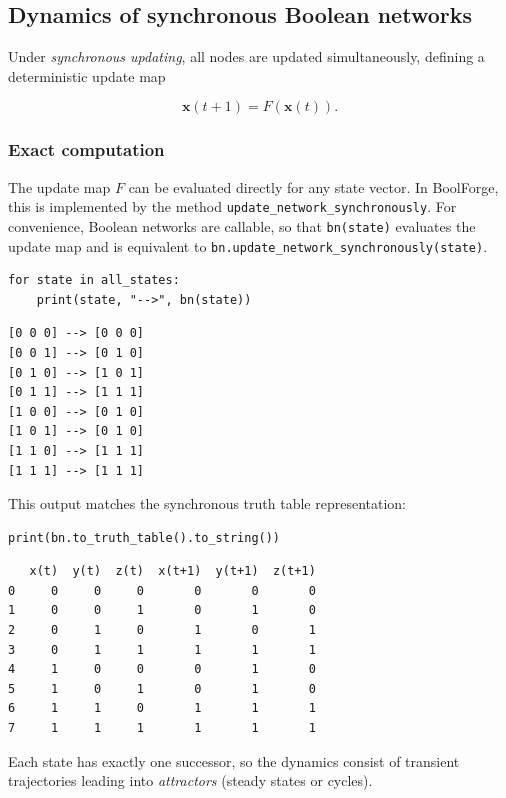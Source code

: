 \documentclass[
]{article}
\begin{document}
\subsection{Dynamics of synchronous Boolean
networks}\label{dynamics-of-synchronous-boolean-networks}

Under \emph{synchronous updating}, all nodes are updated simultaneously,
defining a deterministic update map

\[
\mathbf{x}(t+1) = F(\mathbf{x}(t)).
\]

\subsubsection{Exact computation}\label{exact-computation}

The update map \(F\) can be evaluated directly for any state vector. In
BoolForge, this is implemented by the method
\texttt{update\_network\_synchronously}. For convenience, Boolean
networks are callable, so that \texttt{bn(state)} evaluates the update
map and is equivalent to
\texttt{bn.update\_network\_synchronously(state)}.

\begin{lstlisting}
for state in all_states:
    print(state, "-->", bn(state))
\end{lstlisting}

\begin{lstlisting}
[0 0 0] --> [0 0 0]
[0 0 1] --> [0 1 0]
[0 1 0] --> [1 0 1]
[0 1 1] --> [1 1 1]
[1 0 0] --> [0 1 0]
[1 0 1] --> [0 1 0]
[1 1 0] --> [1 1 1]
[1 1 1] --> [1 1 1]
\end{lstlisting}

This output matches the synchronous truth table representation:

\begin{lstlisting}
print(bn.to_truth_table().to_string())
\end{lstlisting}

\begin{lstlisting}
   x(t)  y(t)  z(t)  x(t+1)  y(t+1)  z(t+1)
0     0     0     0       0       0       0
1     0     0     1       0       1       0
2     0     1     0       1       0       1
3     0     1     1       1       1       1
4     1     0     0       0       1       0
5     1     0     1       0       1       0
6     1     1     0       1       1       1
7     1     1     1       1       1       1
\end{lstlisting}

Each state has exactly one successor, so the dynamics consist of
transient trajectories leading into \emph{attractors} (steady states or
cycles).
\end{document}

